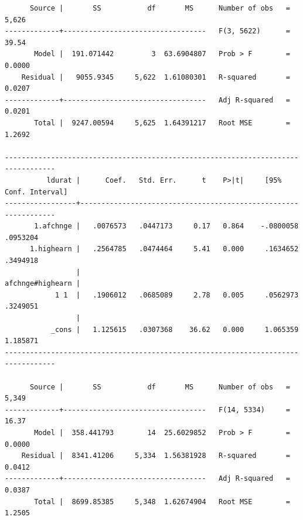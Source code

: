 \documentclass[
]{book}
\begin{document}
\begin{verbatim}
      Source |       SS           df       MS      Number of obs   =     5,626
-------------+----------------------------------   F(3, 5622)      =     39.54
       Model |  191.071442         3  63.6904807   Prob > F        =    0.0000
    Residual |   9055.9345     5,622  1.61080301   R-squared       =    0.0207
-------------+----------------------------------   Adj R-squared   =    0.0201
       Total |  9247.00594     5,625  1.64391217   Root MSE        =    1.2692

----------------------------------------------------------------------------------
          ldurat |      Coef.   Std. Err.      t    P>|t|     [95% Conf. Interval]
-----------------+----------------------------------------------------------------
       1.afchnge |   .0076573   .0447173     0.17   0.864    -.0800058    .0953204
      1.highearn |   .2564785   .0474464     5.41   0.000     .1634652    .3494918
                 |
afchnge#highearn |
            1 1  |   .1906012   .0685089     2.78   0.005     .0562973    .3249051
                 |
           _cons |   1.125615   .0307368    36.62   0.000     1.065359    1.185871
----------------------------------------------------------------------------------

      Source |       SS           df       MS      Number of obs   =     5,349
-------------+----------------------------------   F(14, 5334)     =     16.37
       Model |  358.441793        14  25.6029852   Prob > F        =    0.0000
    Residual |  8341.41206     5,334  1.56381928   R-squared       =    0.0412
-------------+----------------------------------   Adj R-squared   =    0.0387
       Total |  8699.85385     5,348  1.62674904   Root MSE        =    1.2505


\end{verbatim}
\end{document}

